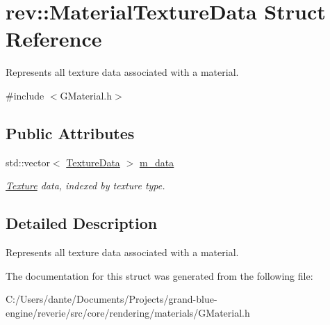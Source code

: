 \hypertarget{structrev_1_1_material_texture_data}{}\section{rev\+::Material\+Texture\+Data Struct Reference}
\label{structrev_1_1_material_texture_data}


Represents all texture data associated with a material.  




{\ttfamily \#include $<$G\+Material.\+h$>$}

\subsection*{Public Attributes}
\begin{DoxyCompactItemize}
\item 
\mbox{\label{structrev_1_1_material_texture_data_a5175e14af49e1503df395105fcebca7f}} 
std\+::vector$<$ \mbox{\hyperlink{structrev_1_1_texture_data}{Texture\+Data}} $>$ \mbox{\hyperlink{structrev_1_1_material_texture_data_a5175e14af49e1503df395105fcebca7f}{m\+\_\+data}}
\begin{DoxyCompactList}\small\item\em \mbox{\hyperlink{classrev_1_1_texture}{Texture}} data, indexed by texture type. \end{DoxyCompactList}\end{DoxyCompactItemize}


\subsection{Detailed Description}
Represents all texture data associated with a material. 

The documentation for this struct was generated from the following file\+:\begin{DoxyCompactItemize}
\item 
C\+:/\+Users/dante/\+Documents/\+Projects/grand-\/blue-\/engine/reverie/src/core/rendering/materials/G\+Material.\+h\end{DoxyCompactItemize}
